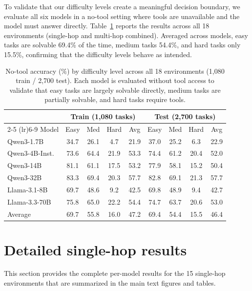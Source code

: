 To validate that our difficulty levels create a meaningful decision boundary, we evaluate all six models in a no-tool setting where tools are unavailable and the model must answer directly. Table~\ref{tab:difficulty_validation} reports the results across all 18 environments (single-hop and multi-hop combined). Averaged across models, easy tasks are solvable 69.4\% of the time, medium tasks 54.4\%, and hard tasks only 15.5\%, confirming that the difficulty levels behave as intended.

\begin{table}[H]
\caption{No-tool accuracy (\%) by difficulty level across all 18 environments (1{,}080 train / 2{,}700 test). Each model is evaluated without tool access to validate that easy tasks are largely solvable directly, medium tasks are partially solvable, and hard tasks require tools.}
\label{tab:difficulty_validation}
\centering
\small
\begin{tabular}{l cccc cccc}
\toprule
& \multicolumn{4}{c}{Train (1{,}080 tasks)} & \multicolumn{4}{c}{Test (2{,}700 tasks)} \\
\cmidrule(lr){2-5} \cmidrule(lr){6-9}
Model & Easy & Med & Hard & Avg & Easy & Med & Hard & Avg \\
\midrule
Qwen3-1.7B     & 34.7 & 26.1 &  4.7 & 21.9 & 37.0 & 25.2 &  6.3 & 22.9 \\
Qwen3-4B-Inst. & 73.6 & 64.4 & 21.9 & 53.3 & 74.4 & 61.2 & 20.4 & 52.0 \\
Qwen3-14B      & 81.1 & 61.1 & 17.5 & 53.2 & 77.9 & 58.1 & 15.2 & 50.4 \\
Qwen3-32B      & 83.3 & 69.4 & 20.3 & 57.7 & 82.8 & 69.1 & 21.3 & 57.7 \\
Llama-3.1-8B   & 69.7 & 48.6 &  9.2 & 42.5 & 69.8 & 48.9 &  9.4 & 42.7 \\
Llama-3.3-70B  & 75.8 & 65.0 & 22.2 & 54.4 & 74.7 & 63.7 & 20.6 & 53.0 \\
\midrule
Average         & 69.7 & 55.8 & 16.0 & 47.2 & 69.4 & 54.4 & 15.5 & 46.4 \\
\bottomrule
\end{tabular}
\end{table}

\newpage
\section{Detailed single-hop results}
\label{app:full_reduction}

This section provides the complete per-model results for the 15 single-hop environments that are summarized in the main text figures and tables.

